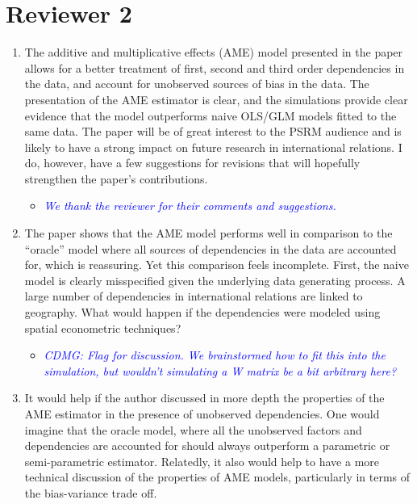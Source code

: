 \section*{Reviewer 2}

\begin{enumerate}
	\item The additive and multiplicative effects (AME) model presented in the paper allows for a better treatment of first, second and third order dependencies in the data, and account for unobserved sources of bias in the data. The presentation of the AME estimator is clear, and the simulations provide clear evidence that the model outperforms naive OLS/GLM models fitted to the same data. The paper will be of great interest to the PSRM audience and is likely to have a strong impact on future research in international relations. I do, however, have a few suggestions for revisions that will hopefully strengthen the paper’s contributions.
	\begin{itemize}
		\item \textcolor{blue}{ \emph{
		We thank the reviewer for their comments and suggestions.
		}}
	\end{itemize}
	\item The paper shows that the AME model performs well in comparison to the “oracle” model where all sources of dependencies in the data are accounted for, which is reassuring. Yet this comparison feels incomplete. First, the naive model is clearly misspecified given the underlying data generating process. A large number of dependencies in international relations are linked to geography. What would happen if the dependencies were modeled using spatial econometric techniques?
	\begin{itemize}
		\item \textcolor{blue}{ \emph{
		CDMG: Flag for discussion. We brainstormed how to fit this into the simulation, but wouldn't simulating a W matrix be a bit arbitrary here? 
		}}
	\end{itemize}
	\item It would help if the author discussed in more depth the properties of the AME estimator in the presence of unobserved dependencies. One would imagine that the oracle model, where all the unobserved factors and dependencies are accounted for should always outperform a parametric or semi-parametric estimator. Relatedly, it also would help to have a more technical discussion of the properties of AME models, particularly in terms of the bias-variance trade off.
	\begin{itemize}

\end{itemize}
\end{enumerate}
